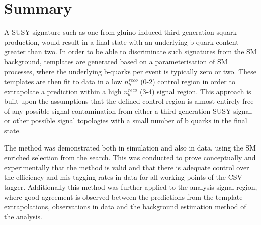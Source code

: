 \section{Summary}
\label{subsec:templateconclusions}

A \ac{SUSY} signature such as one from gluino-induced third-generation squark production, would result in a final state with an underlying b-quark content greater than two. In order to be able to discriminate such signatures from the \ac{SM} background, templates are generated based on a parameterisation of \ac{SM} processes, where the underlying b-quarks per event is typically zero or two. These templates are then fit to data in a low $n_{b}^{reco}$ (0-2) control region in order to extrapolate a prediction within a high $n_{b}^{reco}$ (3-4) signal region. This approach is built upon the assumptions that the defined control region is almost entirely free of any possible signal contamination from either a third generation \ac{SUSY} signal, or other possible signal topologies with a small number of b quarks in the final state.

The method was demonstrated both in simulation and also in data, using the \ac{SM} enriched \mupjets selection from the \alphat search. This was conducted to prove conceptually and experimentally that the method is valid and that there is adequate control over the efficiency and mis-tagging rates in data for all working points of the \ac{CSV} tagger. Additionally this method was further applied to the \alphat analysis signal region, where good agreement is observed between the predictions from the template extrapolations, observations in data and the background estimation method of the \alphat analysis.

